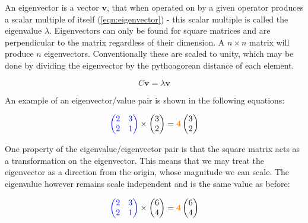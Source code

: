   An eigenvector is a vector $\textbf{v}$, that when operated on by a given operator produces a scalar multiple of itself (\autoref{eqn:eigenvector}) - this scalar multiple is called the eigenvalue $\lambda$. Eigenvectors can only be found for square matrices and are perpendicular to the matrix regardless of their dimension. A $n \times n$ matrix will produce $n$ eigenvectors. Conventionally these are scaled to unity, which may be done by dividing the eigenvector by the pythoagorean distance of each element.

  \begin{equation}
      C\textbf{v} = \lambda\textbf{v}
      \label{eqn:eigenvector}
  \end{equation}

  An example of an eigenvector/value pair is shown in the following equations:

  \begin{equation}
   \textcolor{blue}{
    \begin{pmatrix}
      2 & 3 \\
      2 & 1
    \end{pmatrix}
    }
    \times
    \begin{pmatrix}
      3 \\ 2
    \end{pmatrix}
    =
     \textcolor{orange}{\textbf{4}}
     \begin{pmatrix}
      3 \\ 2
    \end{pmatrix}
  \end{equation}

  One property of the eigenvalue/eigenvector pair is that the square matrix acts as a transformation on the eigenvector. This means that we may treat the eigenvector as a direction from the origin, whose magnitude we can scale. The eigenvalue however remains scale independent and is the same value as before:

  \begin{equation}
   \textcolor{blue}{
    \begin{pmatrix}
      2 & 3 \\
      2 & 1
    \end{pmatrix}
    }
    \times
    \begin{pmatrix}
      6 \\ 4
    \end{pmatrix}
    =
    \textcolor{orange}{\textbf{4}}
     \begin{pmatrix}
      6 \\ 4
    \end{pmatrix}
  \end{equation}

